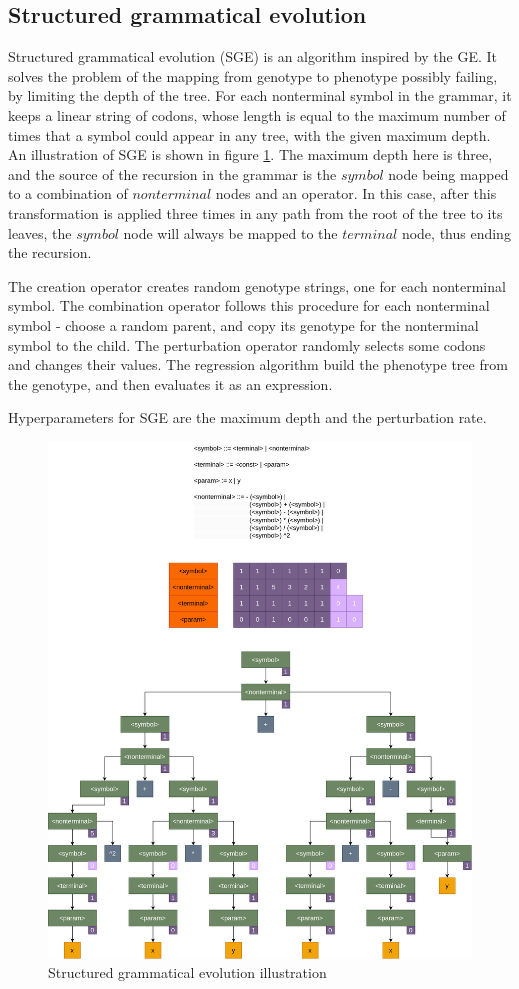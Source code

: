 \subsection{Structured grammatical evolution}

Structured grammatical evolution (SGE) \citep{sge} is an algorithm inspired by the GE. It solves the problem of the mapping from genotype to phenotype possibly failing, by limiting the depth of the tree. For each nonterminal symbol in the grammar, it keeps a linear string of codons, whose length is equal to the maximum number of times that a symbol could appear in any tree, with the given maximum depth. An illustration of SGE is shown in figure \ref{fig:sge}. The maximum depth here is three, and the source of the recursion in the grammar is the $symbol$ node being mapped to a combination of $nonterminal$ nodes and an operator. In this case, after this transformation is applied three times in any path from the root of the tree to its leaves, the $symbol$ node will always be mapped to the $terminal$ node, thus ending the recursion.

The creation operator creates random genotype strings, one for each nonterminal symbol. The combination operator follows this procedure for each nonterminal symbol - choose a random parent, and copy its genotype for the nonterminal symbol to the child. The perturbation operator randomly selects some codons and changes their values. The regression algorithm build the phenotype tree from the genotype, and then evaluates it as an expression.

Hyperparameters for SGE are the maximum depth and the perturbation rate.

\begin{figure}[!htbp]
	\centering
	\includegraphics[scale=0.19]{../images/sge.png}
	\caption{Structured grammatical evolution illustration}
    \label{fig:sge}
\end{figure}
